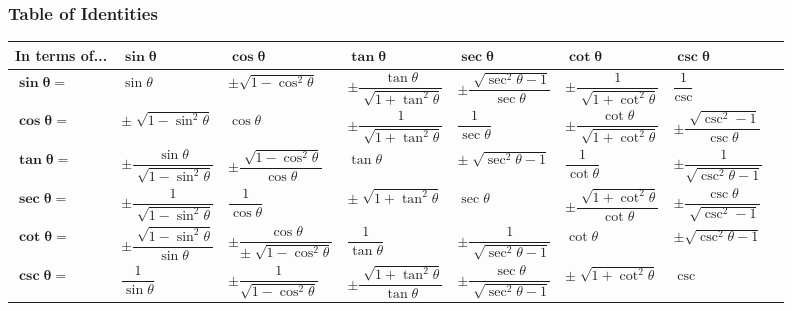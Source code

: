 \subsubsection{Table of Identities}
\begin{tabular}{ |l|l|l|l|l|l|l|l| } 
\hline
In terms of...			& $\mathbf{\sin\theta}$								& $\mathbf{\cos\theta}$										& $\mathbf{\tan\theta}$								& $\mathbf{\sec\theta}$									& $\mathbf{\cot\theta}$								& $\mathbf{\csc\theta}$ 
\\ \hline

$\mathbf{\sin\theta}=$	& $\sin\theta$										& $\pm\sqrt{1-\cos^2\theta}$ 								& $\pm\dfrac{\tan\theta}{\sqrt[]{1+\tan^2\theta}}$	& $\pm\dfrac{\sqrt[]{\sec^2\theta-1}}{\sec\theta}$		& $\pm\dfrac{1}{\sqrt[]{1+\cot^2\theta}}$			& $\dfrac{1}{\csc}$
\\\hline

$\mathbf{\cos\theta}=$	& $\pm\sqrt[]{1-\sin^2\theta}$ 						& $\cos\theta$ 												& $\pm\dfrac{1}{\sqrt[]{1+\tan^2\theta}}$ 			& $\dfrac{1}{\sec\theta}$ 								& $\pm\dfrac{\cot\theta}{\sqrt[]{1+\cot^2\theta}}$ 	& $\pm\dfrac{\sqrt[]{\csc^2-1}}{\csc\theta}$
\\\hline

$\mathbf{\tan\theta}=$	& $\pm\dfrac{\sin\theta}{\sqrt[]{1-\sin^2\theta}}$ 	& $\pm\dfrac{\sqrt[]{1-\cos^2\theta}}{\cos\theta}$ 			& $\tan\theta$ 										& $\pm\sqrt[]{\sec^2\theta-1}$ 							& $\dfrac{1}{\cot\theta}$ 							& $\pm\dfrac{1}{\sqrt{\csc^2\theta-1}}$
\\\hline

$\mathbf{\sec\theta}=$	& $\pm\dfrac{1}{\sqrt[]{1-\sin^2\theta}}$ 			& $\dfrac{1}{\cos\theta}$ 									& $\pm\sqrt[]{1+\tan^2\theta}$ 						& $\sec\theta$ 											& $\pm\dfrac{\sqrt[]{1+\cot^2\theta}}{\cot\theta}$ 	& $\pm\dfrac{\csc\theta}{\sqrt[]{\csc^2-1}}$
\\\hline

$\mathbf{\cot\theta}=$	& $\pm\dfrac{\sqrt[]{1-\sin^2\theta}}{\sin\theta}$ 	& $\pm\dfrac{\cos\theta}{\pm\sqrt[]{1-\cos^2\theta}}$ 		& $\dfrac{1}{\tan\theta}$ 							& $\pm\dfrac{1}{\sqrt[]{\sec^2\theta-1}}$ 				& $\cot\theta$ 										& $\pm\sqrt{\csc^2\theta-1}$
\\\hline

$\mathbf{\csc\theta}=$	& $\dfrac{1}{\sin\theta}$ 							& $\pm\dfrac{1}{\sqrt{1-\cos^2\theta}}$						& $\pm\dfrac{\sqrt[]{1+\tan^2\theta}}{\tan\theta}$	& $\pm\dfrac{\sec\theta}{\sqrt[]{\sec^2\theta-1}}$		& $\pm\sqrt[]{1+\cot^2\theta}$						& $\csc$
\\\hline
\end{tabular}

